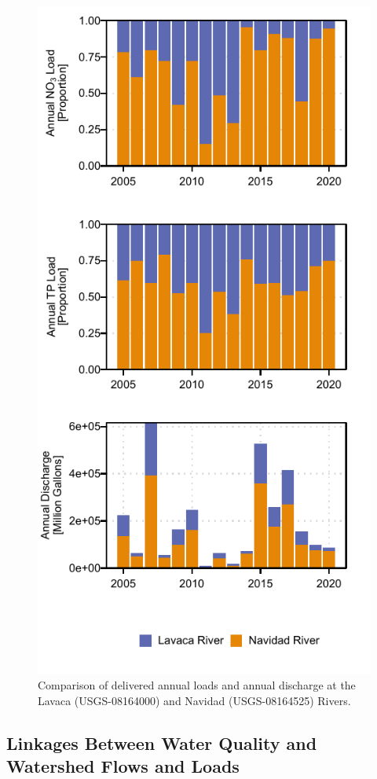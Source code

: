 \documentclass[fleqn,10pt,lineno]{wlpeerj} %
\providecommand{\DIFaddbeginFL}{} %
\providecommand{\DIFaddendFL}{} %
\providecommand{\DIFdelbeginFL}{} %
\providecommand{\DIFdelendFL}{} %
\begin{document}
\begin{figure}

{\centering \DIFdelbeginFL %
\DIFdelendFL \DIFaddbeginFL \includegraphics[width=0.5\linewidth,]{Schramm-2023-08-PeerJ_files/figure-latex/fig4} 
\DIFaddendFL 

}

\caption{Comparison of delivered annual loads and annual discharge at the Lavaca (USGS-08164000) and Navidad (USGS-08164525) Rivers.}\label{fig:fig4}
\end{figure}

\hypertarget{linkages-between-water-quality-and-watershed-flows-and-loads}{%
\subsection*{Linkages Between Water Quality and Watershed Flows and
Loads}\label{linkages-between-water-quality-and-watershed-flows-and-loads}}
\end{document}
